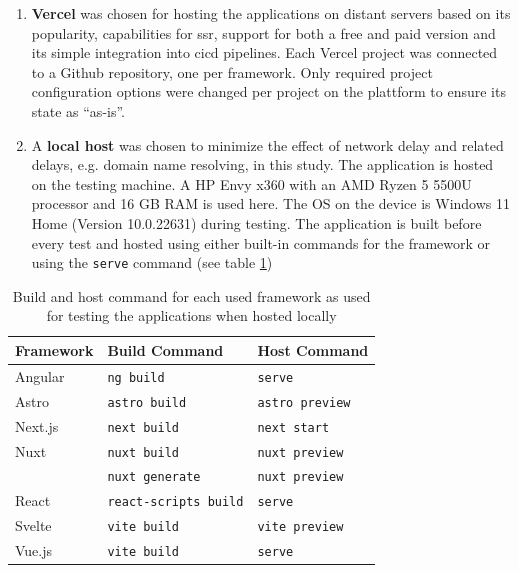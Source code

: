 \documentclass[a4paper, 12pt]{article}
\begin{document}
\begin{enumerate}
  \item \textbf{Vercel} was chosen for hosting the applications on distant servers based on its popularity, capabilities for \acrfull{ssr}, support for both a free and paid version and its simple integration into \acrshort{cicd} pipelines.
  Each Vercel project was connected to a Github repository, one per framework.
  Only required project configuration options were changed per project on the plattform to ensure its state as \enquote{as-is}.
  \item A \textbf{local host} was chosen to minimize the effect of network delay and related delays, e.g. domain name resolving, in this study.
  The application is hosted on the testing machine.
  A HP Envy x360 with an AMD Ryzen 5 5500U processor and 16 GB RAM is used here.
  The OS on the device is Windows 11 Home (Version 10.0.22631) during testing.
  The application is built before every test and hosted using either built-in commands for the framework or using the \verb|serve| command (see table \ref{tab:hostCommands})
\end{enumerate}

\begin{table}[h]
  \begin{center}
    \begin{tabular}[h]{| l | l | l |}
      \hline
      \textbf{Framework} & \textbf{Build Command} & \textbf{Host Command} \\ \hline
      Angular & \verb|ng build| & \verb|serve| \\ \hline
      Astro & \verb|astro build| & \verb|astro preview| \\ \hline
      Next.js & \verb|next build| & \verb|next start| \\ \hline
      Nuxt & \verb|nuxt build| & \verb|nuxt preview| \\
      & \verb|nuxt generate| & \verb|nuxt preview| \\ \hline
      React & \verb|react-scripts build| & \verb|serve| \\ \hline
      Svelte & \verb|vite build| & \verb|vite preview| \\ \hline
      Vue.js & \verb|vite build| & \verb|serve| \\ \hline
    \end{tabular}
  \end{center}
  \caption{Build and host command for each used framework as used for testing the applications when hosted locally}\label{tab:hostCommands}
\end{table}
\end{document}
